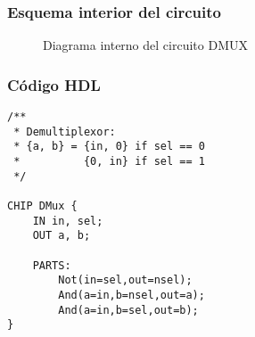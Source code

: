 \documentclass[12pt]{article}
\begin{document}
        \subsubsection{Esquema interior del circuito}
            \begin{figure}[H]
                \centering
                
                \caption{Diagrama interno del circuito DMUX} \cite{diagram}
                \label{fig:enter-label}
            \end{figure}
        \newpage \subsubsection{Código HDL}  
        \begin{lstlisting}
/**
 * Demultiplexor:
 * {a, b} = {in, 0} if sel == 0
 *          {0, in} if sel == 1
 */

CHIP DMux {
    IN in, sel;
    OUT a, b;

    PARTS:
        Not(in=sel,out=nsel);
        And(a=in,b=nsel,out=a);
        And(a=in,b=sel,out=b);
}
        \end{lstlisting}
    \newpage

\printbibliography[heading=bibintoc]
\end{document}
